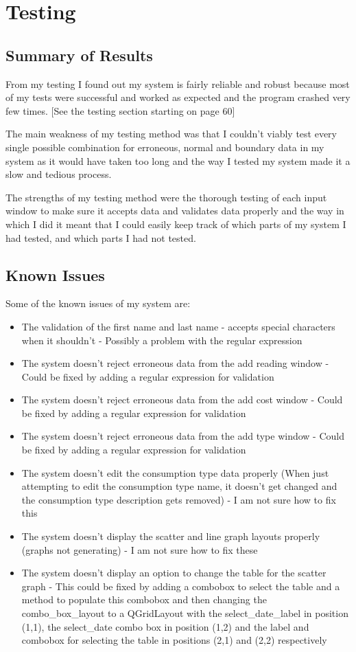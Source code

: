 \section{Testing}

\subsection{Summary of Results}
From my testing I found out my system is fairly reliable and robust because most of my tests were successful and worked as expected and the program crashed very few times. [See the testing section starting on page 60]

The main weakness of my testing method was that I couldn't viably test every single possible combination for erroneous, normal and boundary data in my system as it would have taken too long and the way I tested my system made it a slow and tedious process.

The strengths of my testing method were the thorough testing of each input window to make sure it accepts data and validates data properly and the way in which I did it meant that I could easily keep track of which parts of my system I had tested, and which parts I had not tested.

\subsection{Known Issues}
Some of the known issues of my system are:
\begin{itemize}
	\item{The validation of the first name and last name - accepts special characters when it shouldn't - Possibly a problem with the regular expression}
	\item{The system doesn't reject erroneous data from the add reading window - Could be fixed by adding a regular expression for validation}
	\item{The system doesn't reject erroneous data from the add cost window - Could be fixed by adding a regular expression for validation}
	\item{The system doesn't reject erroneous data from the add type window - Could be fixed by adding a regular expression for validation}
	\item{The system doesn't edit the consumption type data properly (When just attempting to edit the consumption type name, it doesn't get changed and the consumption type description gets removed) - I am not sure how to fix this}
	\item{The system doesn't display the scatter and line graph layouts properly (graphs not generating) - I am not sure how to fix these}
	\item{The system doesn't display an option to change the table for the scatter graph - This could be fixed by adding a combobox to select the table and a method to populate this combobox and then changing the combo\_box\_layout to a QGridLayout with the select\_date\_label in position (1,1), the select\_date combo box in position (1,2) and the label and combobox for selecting the table in positions (2,1) and (2,2) respectively}
\end{itemize}

